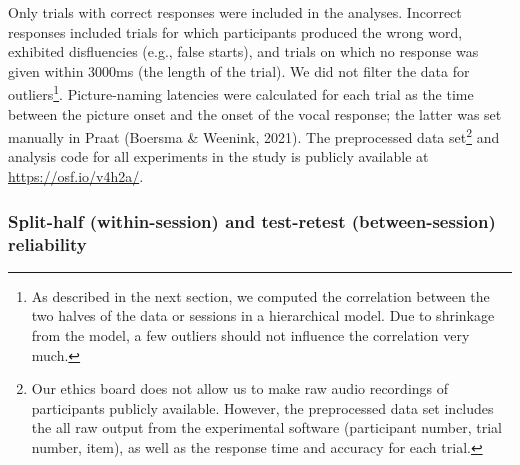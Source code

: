 \documentclass[
  man,floatsintext]{apa6}
\begin{document}
Only trials with correct responses were included in the analyses. Incorrect responses included trials for which participants produced the wrong word, exhibited disfluencies (e.g., false starts), and trials on which no response was given within 3000ms (the length of the trial). We did not filter the data for outliers\footnote{As described in the next section, we computed the correlation between the two halves of the data or sessions in a hierarchical model. Due to shrinkage from the model, a few outliers should not influence the correlation very much.}. Picture-naming latencies were calculated for each trial as the time between the picture onset and the onset of the vocal response; the latter was set manually in Praat (Boersma \& Weenink, 2021). The preprocessed data set\footnote{Our ethics board does not allow us to make raw audio recordings of participants publicly available. However, the preprocessed data set includes the all raw output from the experimental software (participant number, trial number, item), as well as the response time and accuracy for each trial.} and analysis code for all experiments in the study is publicly available at \url{https://osf.io/v4h2a/}.

\hypertarget{split-half-within-session-and-test-retest-between-session-reliability}{%
\subsubsection{Split-half (within-session) and test-retest (between-session) reliability}\label{split-half-within-session-and-test-retest-between-session-reliability}}
\end{document}
